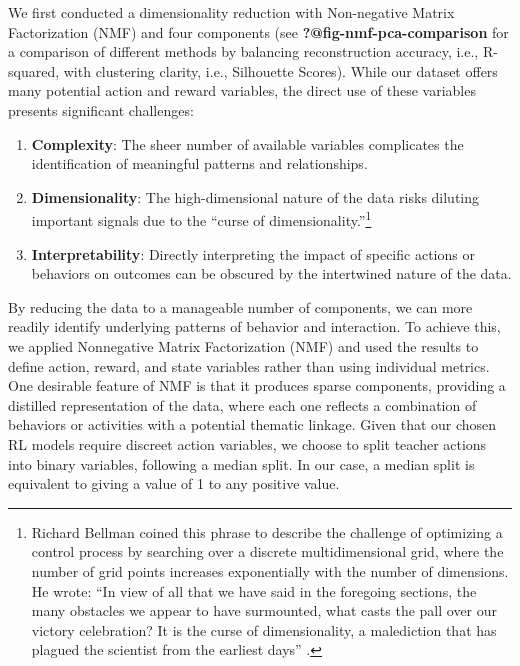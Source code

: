 \documentclass[
  number,
  preprint,
  3p,
  onecolumn]{elsarticle}
\providecommand{\tightlist}{%
  \setlength{\itemsep}{0pt}\setlength{\parskip}{0pt}}\usepackage{longtable,booktabs,array}
\begin{document}
We first conducted a dimensionality reduction with Non-negative Matrix
Factorization (NMF) and four components (see
\textbf{?@fig-nmf-pca-comparison} for a comparison of different methods
by balancing reconstruction accuracy, i.e., R-squared, with clustering
clarity, i.e., Silhouette Scores). While our dataset offers many
potential action and reward variables, the direct use of these variables
presents significant challenges:

\begin{enumerate}
\def\labelenumi{\arabic{enumi}.}
\tightlist
\item
  \textbf{Complexity}: The sheer number of available variables
  complicates the identification of meaningful patterns and
  relationships.
\item
  \textbf{Dimensionality}: The high-dimensional nature of the data risks
  diluting important signals due to the ``curse of
  dimensionality.''\footnote{Richard Bellman coined this phrase to
    describe the challenge of optimizing a control process by searching
    over a discrete multidimensional grid, where the number of grid
    points increases exponentially with the number of dimensions. He
    wrote: ``In view of all that we have said in the foregoing sections,
    the many obstacles we appear to have surmounted, what casts the pall
    over our victory celebration? It is the curse of dimensionality, a
    malediction that has plagued the scientist from the earliest days''
    \citep{bellman2015adaptive}.}
\item
  \textbf{Interpretability}: Directly interpreting the impact of
  specific actions or behaviors on outcomes can be obscured by the
  intertwined nature of the data.
\end{enumerate}

By reducing the data to a manageable number of components, we can more
readily identify underlying patterns of behavior and interaction. To
achieve this, we applied Nonnegative Matrix Factorization (NMF) and used
the results to define action, reward, and state variables rather than
using individual metrics. One desirable feature of NMF is that it
produces sparse components, providing a distilled representation of the
data, where each one reflects a combination of behaviors or activities
with a potential thematic linkage. Given that our chosen RL models
require discreet action variables, we choose to split teacher actions
into binary variables, following a median split. In our case, a median
split is equivalent to giving a value of 1 to any positive value.
\end{document}
